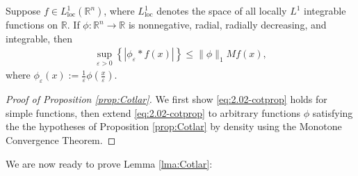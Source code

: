 \documentclass[../dissertation.tex]{subfiles}
\begin{document}
\begin{prop}\label{prop:Cotlar}
    Suppose $f \in L^1_{\text{loc}}(\mathbb R^n)$, where $L^1_{\text{loc}}$ denotes
    the space of all locally $L^1$ integrable functions on $\mathbb R$. 
    If $\phi : \mathbb R^n \to \mathbb R$ is nonnegative, 
    radial, radially decreasing, and integrable, then
    \begin{align}\label{eq:2.02-cotprop}
    	\sup_{\varepsilon > 0} \left\{ \left| \phi_\varepsilon * f(x) \right| \right\} 
            \leq \| \phi \|_1 M f(x), 
    \end{align}
    where $\phi_\varepsilon(x) := \frac{1}{\varepsilon} \phi\left( \frac{x}{\varepsilon} \right)$.
\end{prop}
\begin{proof}[Proof of Proposition \ref{prop:Cotlar}]
	We first show \eqref{eq:2.02-cotprop} holds for simple functions, then extend 
	\eqref{eq:2.02-cotprop} to arbitrary functions $\phi$ satisfying the the hypotheses 
	of Proposition \ref{prop:Cotlar} by density using the Monotone Convergence Theorem.
\end{proof}

We are now ready to prove Lemma \ref{lma:Cotlar}:
\end{document}
